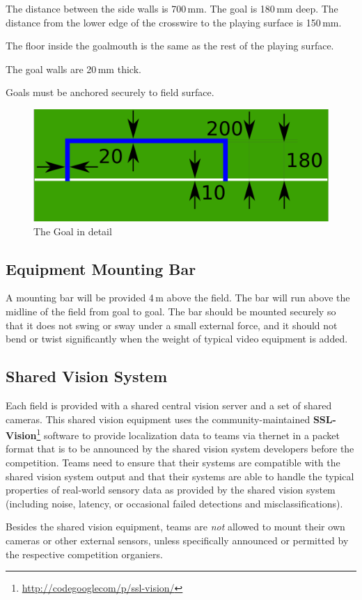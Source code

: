 The distance between the side walls is 700\,mm.
The goal is 180\,mm deep.
The distance from the lower edge of the crosswire to the playing surface is 150\,mm.

The floor inside the goalmouth is the same as the rest of the playing surface.

The goal walls are 20\,mm thick.

Goals must be anchored securely to field surface.

\begin{figure}[ht] %
	\centering
	\includegraphics[width=0.5\columnwidth]{img/goal_detail.png}
	\caption{The Goal in detail}
	\label{fig:sslgoal}
\end{figure}

\subsection{Equipment Mounting Bar}
A mounting bar will be provided 4\,m above the field.
The bar will run above the midline of the field from goal to goal.
The bar should be mounted securely so that it does not swing or sway under a small external force, and it should not bend or twist significantly when the weight of typical video equipment is added.

\subsection{Shared Vision System}
Each field is provided with a shared central vision server and a set of shared cameras.
This shared vision equipment uses the community-maintained \textbf{SSL-Vision}\footnote{\url{http://codegooglecom/p/ssl-vision/}} software to provide localization data to teams via thernet in a packet format that is to be announced by the shared vision system developers before the competition.
Teams need to ensure that their systems are compatible with the shared vision system output and that their systems are able to handle the typical properties of real-world sensory data as provided by the shared vision system (including noise, latency, or occasional failed detections and misclassifications).

Besides the shared vision equipment, teams are \emph{not} allowed to mount their own cameras or other external sensors, unless specifically announced or permitted by the respective competition organiers.

